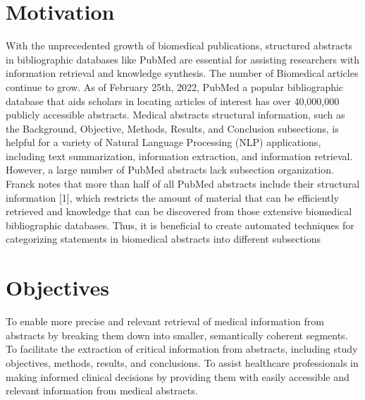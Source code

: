 \documentclass[12pt,a4paper]{report}     %
\begin{document}
\begin{normalsize}
\section{Motivation}
{\setlength{\baselineskip}{1.1\baselineskip}
With the unprecedented growth of biomedical publications, structured abstracts in bibliographic databases  like PubMed are essential for assisting researchers with information retrieval and knowledge synthesis.
The number of Biomedical articles continue to grow. As of February 25th, 2022, PubMed a popular bibliographic database that aids scholars in locating articles of interest has over 40,000,000 publicly accessible abstracts. Medical abstracts structural information, such as the Background, Objective, Methods, Results, and Conclusion subsections, is helpful for a variety of Natural Language Processing (NLP) applications, including text summarization, information extraction, and information retrieval. However, a large number of PubMed abstracts lack subsection organization. Franck notes that more than half of all PubMed abstracts include their structural information [1], which restricts the amount of material that can be efficiently retrieved and knowledge that can be discovered from those extensive biomedical bibliographic databases. Thus, it is beneficial to create automated techniques for categorizing statements in biomedical abstracts into different subsections
\par}	

\section{Objectives}
{\setlength{\baselineskip}{1.1\baselineskip}
To enable more precise and relevant retrieval of medical information from abstracts by breaking them down into smaller, semantically coherent segments.
To facilitate the extraction of critical information from abstracts, including study objectives, methods, results, and conclusions. 
To assist healthcare professionals in making informed clinical decisions by providing them with easily accessible and relevant information from medical abstracts.

}

\end{normalsize}
\end{document}
